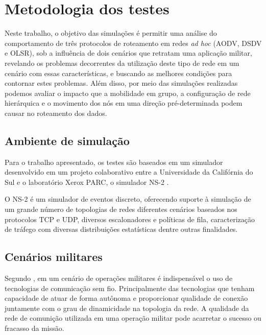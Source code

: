 \section{Metodologia dos testes} 
Neste trabalho, o objetivo das simula\c{c}\~oes \'e permitir uma an\'alise do comportamento de tr\^es protocolos de roteamento em redes \textit{ad hoc} (AODV, DSDV e OLSR), sob a influ\^encia de dois cen\'arios que retratam uma aplica\c{c}\~ao militar, revelando os problemas decorrentes da utiliza\c{c}\~ao deste tipo de rede em um cen\'ario com essas caracter\'isticas, e buscando as melhores condi\c{c}\~oes para contornar estes problemas. 
Al\'em disso, por meio das simula\c{c}\~oes realizadas podemos avaliar o impacto que a mobilidade em grupo, a configura\c{c}\~ao de rede hier\'arquica e o movimento dos n\'os em uma dire\c{c}\~ao pr\'e-determinada podem causar no roteamento dos dados.

\subsection{Ambiente de simula\c{c}\~ ao}
Para o trabalho apresentado, os testes s\~ao baseados em um simulador desenvolvido em um projeto colaborativo entre a Universidade da Calif\'ornia do Sul e o laborat\'orio Xerox PARC, o simulador NS-2 \cite{FallVaradhan}.

O NS-2 \'e um simulador de eventos discreto, oferecendo suporte \`a simula\c{c}\~ao de um grande n\'umero de topologias de redes diferentes cen\'arios baseados nos protocolos TCP e UDP, diversos escalonadores e pol\'iticas de fila, caracteriza\c{c}\~ao de tr\'afego com diversas distribui\c{c}\~oes estat\'isticas dentre outras finalidades.

\subsection{Cen\'arios militares}
Segundo \cite{pereira}, em um cen\'ario de opera\c{c}\~oes militares \'e indispens\'avel o uso de tecnologias de comunica\c{c}\~ao sem fio. 
Principalmente das tecnologias que tenham capacidade de atuar de forma aut\^onoma e proporcionar qualidade de conex\~ao juntamente com o grau de dinamicidade na topologia da rede.
A qualidade da rede de comuni\c{c}\~ao utilizada em uma opera\c{c}\~ao militar pode acarretar o sucesso ou fracasso da miss\~ao.

